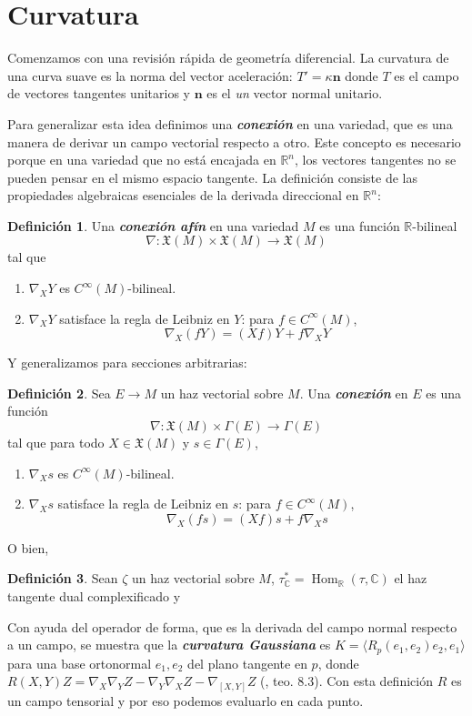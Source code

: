 \documentclass[spanish]{article}
\theoremstyle{definition}
\newtheorem*{defn}{Definición}
\newcommand{\R}{\mathbb{R}}
\newcommand{\C}{\mathbb{C}}
\newcommand{\X}{\mathfrak{X}}
\newcommand{\Cinf}{C^\infty}
\DeclareMathOperator{\Hom}{Hom}
\begin{document}
	
	\iffalse
	\clearpage
	\section{Curvatura}
	Comenzamos con una revisión rápida de geometría diferencial. La curvatura de una curva suave es la norma del vector aceleración: $T'=\kappa\mathbf{n}$ donde $T$ es el campo de vectores tangentes unitarios y $\mathbf{n}$ es el \textit{un} vector normal unitario.
	
	Para generalizar esta idea definimos una \textit{\textbf{conexión}} en una variedad, que es una manera de derivar un campo vectorial respecto a otro. Este concepto es necesario porque en una variedad que no está encajada en $\R^n$, los vectores tangentes no se pueden pensar en el mismo espacio tangente. La definición consiste de las propiedades algebraicas esenciales de la derivada direccional en $\R^n$:
	
	\begin{defn}
		Una \textbf{\textit{conexión afín}} en una variedad $M$ es una función $\R$-bilineal
		\[\nabla:\X(M)\times\X(M)\to\X(M)\]
		tal que
		\begin{enumerate}
			\item $\nabla_XY$ es $\Cinf(M)$-bilineal.
			\item $\nabla_XY$ satisface la regla de Leibniz en $Y$: para $f\in\Cinf(M)$,
			\[\nabla_X(fY)=(Xf)Y+f\nabla_XY\]
		\end{enumerate}
	\end{defn}
	Y generalizamos para secciones arbitrarias:
	\begin{defn}
		Sea $E\to M$ un haz vectorial sobre $M$. Una \textbf{\textit{conexión}} en $E$ es una función
		\[\nabla:\X(M)\times\Gamma(E)\to \Gamma(E)\]
		tal que para todo $X\in\X(M)$ y $s\in\Gamma(E)$,
		\begin{enumerate}
			\item $\nabla_Xs$ es $\Cinf(M)$-bilineal.
			\item $\nabla_Xs$ satisface la regla de Leibniz en $s$: para $f\in\Cinf(M)$,
			\[\nabla_X(fs)=(Xf)s+f\nabla_Xs\]
		\end{enumerate}
	\end{defn}
	O bien,
	\begin{defn}
		Sean $\zeta$ un haz vectorial sobre $M$, $\tau^*_\C=\Hom_\R(\tau,\C)$ el haz tangente dual complexificado y 
	\end{defn}
	
	Con ayuda del operador de forma, que es la derivada del campo normal respecto a un campo, se muestra que la \textbf{\textit{curvatura Gaussiana}} es $K=\langle R_p(e_1,e_2)e_2,e_1\rangle$ para una base ortonormal $e_1,e_2$ del plano tangente en $p$, donde $R(X,Y)Z=\nabla_X\nabla_YZ-\nabla_Y\nabla_XZ-\nabla_{[X,Y]}Z$ (\cite{Loring-dif}, teo. 8.3). Con esta definición $R$ es un campo tensorial y por eso podemos evaluarlo en cada punto.
	
\end{document}

